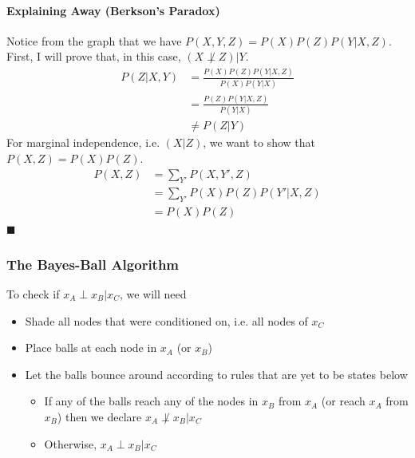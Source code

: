 \documentclass[11pt]{article}
\newcommand{\qed}{\hfill $\blacksquare$}
\begin{document}
\paragraph{Explaining Away (Berkson's Paradox)}
\begin{center}
\end{center}
Notice from the graph that we have $P(X,Y,Z) = P(X)P(Z)P(Y|X,Z)$.
First, I will prove that, in this case, $(X \not\perp Z) | Y$.
\begin{align*}
    P(Z|X,Y) &= \frac{P(X)P(Z)P(Y|X,Z)}{P(X)P(Y|X)} \\
    &= \frac{P(Z)P(Y|X,Z)}{P(Y|X)} \\
    &\neq P(Z|Y)
\end{align*}
For marginal independence, i.e. $(X|Z)$, we want to show that $P(X,Z) = P(X)P(Z)$. 
\begin{align*}
    P(X,Z) &= \sum_{Y'} P(X,{Y'},Z) \\
    &= \sum_{Y'} P(X)P(Z)P({Y'}|X,Z) \\
    &= P(X)P(Z)    
\end{align*}
\qed

\subsubsection{The Bayes-Ball Algorithm}
To check if $x_A\perp x_B | x_C$, we will need
\begin{itemize}
    \item Shade all nodes that were conditioned on, i.e. all nodes of $x_C$
    \item Place balls at each node in $x_A$ (or $x_B$)
    \item Let the balls bounce around according to rules that are yet to be states below
    \begin{itemize}
        \item If any of the balls reach any of the nodes in $x_B$ from $x_A$ (or reach $x_A$ from $x_B$) then we declare $x_{A} \not \perp x_{B} | x_{C}$
        \item Otherwise, $x_{A} \perp x_{B} | x_{C}$
    \end{itemize}
\end{itemize}
\end{document}
